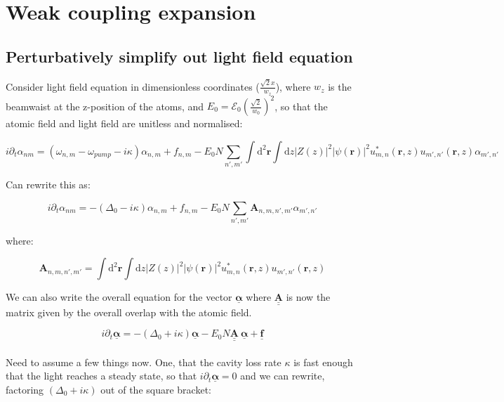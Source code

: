 \documentclass[a4paper,nobalancelastpage]{revtex4-1}
\newcommand{\vect}[1]{\bm{#1}}
\newcommand{\uvect}[1]{\bm{\underline{#1}}}
\newcommand{\umat}[1]{\bm{\underline{\underline{#1}}}}
\begin{document}
\section*{Weak coupling expansion}
\subsection{Perturbatively simplify out light field equation}

Consider light field equation in dimensionless coordinates ($\frac{\sqrt{2} x}{w_z}$), where $w_z$ is the beamwaist at the z-position of the atoms, and $E_0=\mathcal{E}_0 \left( \frac{\sqrt{2}}{w_0}\right)^2$, so that the atomic field and light field are unitless and normalised:

\begin{equation}
\label{eq:eqnalphafirst}
 i\partial_t \alpha_{nm}=(\omega_{n,m}-\omega_{pump}-i\kappa)\alpha_{n,m}+f_{n,m} - E_0 N \sum_{n',m'}  \int \mathrm{d}^2\vect{r} \int \mathrm{d}z |Z(z)|^2 |\psi(\vect{r})|^2 u^*_{m,n}(\vect{r},z) u_{m',n'}(\vect{r},z)\alpha_{m',n'}
\end{equation}

Can rewrite this as:

\begin{equation}
 i\partial_t \alpha_{nm}=-(\Delta_0-i\kappa)\alpha_{n,m}+f_{n,m} - E_0 N \sum_{n',m'} \mathbf{A}_{n,m,n',m'}\alpha_{m',n'}
\end{equation}

where:

\begin{equation}
\label{eq:Amn}
\mathbf{A}_{n,m,n',m'}= \int \mathrm{d}^2 \vect{r} \int  \mathrm{d}z |Z(z)|^2 |\psi(\vect{r})|^2 u^*_{m,n}(\vect{r},z) u_{m',n'}(\vect{r},z)
\end{equation}

We can also write the overall equation for the vector $\uvect{\alpha}$ where $\umat{A}$ is now the matrix given by the overall overlap with the atomic field.

\begin{equation}
i\partial_t \uvect{\alpha} =-(\Delta_0+i\kappa)\uvect{\alpha}- E_0 N \umat{A} \ \uvect{\alpha} + \uvect{f} 
\end{equation}
\\
Need to assume a few things now.
One, that the cavity loss rate $\kappa$ is fast enough that the light reaches a steady state, so that $i \partial_t \uvect{\alpha}=0$ and we can rewrite, factoring $(\Delta_0+i\kappa)$ out of the square bracket:
\end{document}

